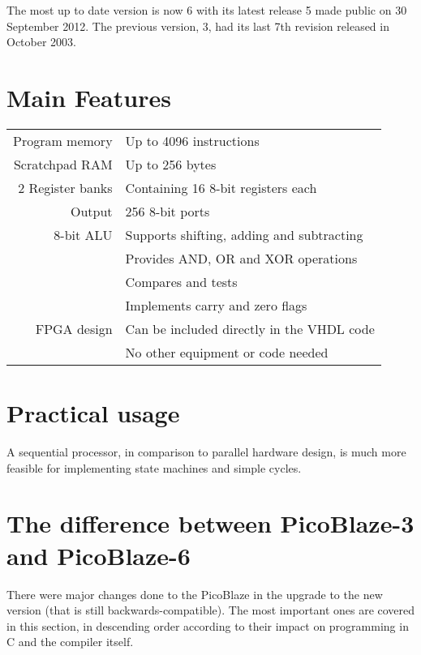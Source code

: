 The most up to date version is now 6 with its latest release 5 made public on 30 September 2012. The previous version, 3, had its last 7th revision released in October 2003. %

    \section{Main Features}

    \begin{center}
    \begin{tabular}{ @{\extracolsep{\fill} } r | l }
        Program memory & Up to 4096 instructions \\

        Scratchpad RAM & Up to 256 bytes \\

        2 Register banks & Containing 16 8-bit registers each\\

        Output & 256 8-bit ports \\

        8-bit ALU & Supports shifting, adding and subtracting \\
                  & Provides AND, OR and XOR operations \\
                  & Compares and tests \\
                  & Implements carry and zero flags \\

        FPGA design & Can be included directly in the VHDL code \\
                    & No other equipment or code needed \\
    \end{tabular}
    \end{center}

    \section{Practical usage}

    A sequential processor, in comparison to parallel hardware design, is much more feasible for implementing state machines and simple cycles.

    \section{The difference between PicoBlaze-3 and PicoBlaze-6}

    There were major changes done to the PicoBlaze in the upgrade to the new version (that is still backwards-compatible). 
    The most important ones are covered in this section, in descending order according to their impact on programming in C and the compiler itself.


